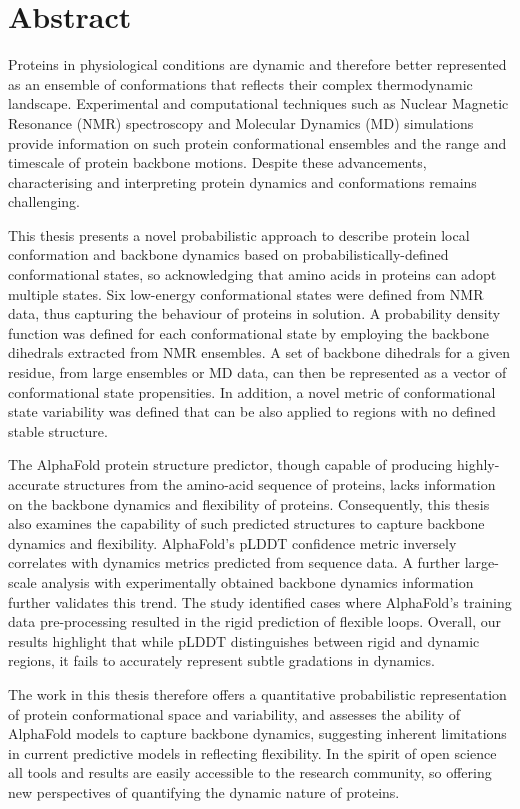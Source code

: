 \chapter*{Abstract}

Proteins in physiological conditions are dynamic and therefore better represented as an ensemble of conformations that reflects their complex thermodynamic landscape. Experimental and computational techniques such as Nuclear Magnetic Resonance (NMR) spectroscopy and Molecular Dynamics (MD) simulations provide information on such protein conformational ensembles and the range and timescale of protein backbone motions. Despite these advancements, characterising and interpreting protein dynamics and conformations remains challenging.

This thesis presents a novel probabilistic approach to describe protein local conformation and backbone dynamics based on probabilistically-defined conformational states, so acknowledging that amino acids in proteins can adopt multiple states. Six low-energy conformational states were defined from NMR data, thus capturing the behaviour of proteins in solution. A probability density function was defined for each conformational state by employing the backbone dihedrals extracted from NMR ensembles. A set of backbone dihedrals for a given residue, from large ensembles or MD data, can then be represented as a vector of conformational state propensities.  In addition, a novel metric of conformational state variability was defined that can be also applied to regions with no defined stable structure.

The AlphaFold protein structure predictor, though capable of producing highly-accurate structures from the amino-acid sequence of proteins, lacks information on the backbone dynamics and flexibility of proteins. Consequently, this thesis also examines the capability of such predicted structures to capture backbone dynamics and flexibility. AlphaFold's pLDDT confidence metric inversely correlates with dynamics metrics predicted from sequence data. A further large-scale analysis with experimentally obtained backbone dynamics information further validates this trend. The study identified cases where AlphaFold’s training data pre-processing resulted in the rigid prediction of flexible loops. Overall, our results highlight that while pLDDT distinguishes between rigid and dynamic regions, it fails to accurately represent subtle gradations in dynamics.
 
The work in this thesis therefore offers a quantitative probabilistic representation of protein conformational space and variability, and  assesses the ability of AlphaFold models to capture backbone dynamics, suggesting inherent limitations in current predictive models in reflecting flexibility. In the spirit of open science all tools and results are easily accessible to the research community, so offering new perspectives of quantifying the dynamic nature of proteins.